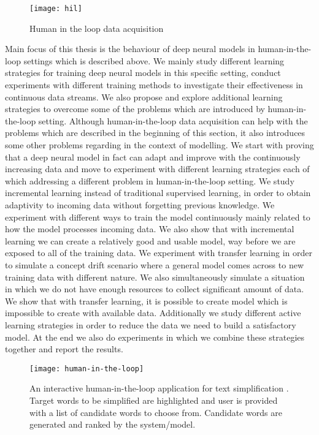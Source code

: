 \begin{figure}[h]
\texttt{[image: hil]}
\centering
\caption{Human in the loop data acquisition}
\end{figure}

Main focus of this thesis is the behaviour of deep neural models in human-in-the-loop settings which is described above. We mainly study different learning strategies for training deep neural models in this specific setting, conduct experiments with different training methods to investigate their effectiveness in continuous data streams. We also propose and explore additional learning strategies to overcome some of the problems which are introduced by human-in-the-loop setting. Although human-in-the-loop data acquisition can help with the problems which are described in the beginning of this section, it also introduces some other problems regarding in the context of modelling. We start with proving that a deep neural model in fact can adapt and improve with the continuously increasing data and move to experiment with different learning strategies each of which addressing a different problem in human-in-the-loop setting. We study incremental learning instead of traditional supervised learning, in order to obtain adaptivity to incoming data without forgetting previous knowledge. We experiment with different ways to train the model continuously mainly related to how the model processes incoming data. We also show that with incremental learning we can create a relatively good and usable model, way before we are exposed to all of the training data. We experiment with transfer learning in order to simulate a concept drift scenario where a general model comes across to new training data with different nature. We also simultaneously simulate a situation in which we do not have enough resources to collect significant amount of data. We show that with transfer learning, it is possible to create model which is impossible to create with available data. Additionally we study different active learning strategies in order to reduce the data we need to build a satisfactory model. At the end we also do experiments in which we combine these strategies together and report the results.

\begin{figure}[h]
\texttt{[image: human-in-the-loop]}
\centering
\caption{An interactive human-in-the-loop application for text simplification \cite{par4sim}. Target words to be simplified are highlighted and user is provided with a list of candidate words to choose from. Candidate words are generated and ranked by the system/model.}
\end{figure}


